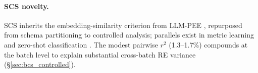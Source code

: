 \paragraph{SCS novelty.}
SCS inherits the embedding-similarity criterion from LLM-PEE \citep{llm-pee-2025}, repurposed from schema partitioning to controlled analysis; parallels exist in metric learning \citep{snell2017prototypical} and zero-shot classification \citep{yin-2019-zero-shot-bench}. The modest pairwise $r^2$ (1.3--1.7\%) compounds at the batch level to explain substantial cross-batch RE variance (\S\ref{sec:bcs_controlled}).

\begin{table}[t]
\centering
\small
{}
\caption{Dataset statistics. BCS Range: min--max over count-curve batches. Embedding: model used for SCS/BCS; ranges are not comparable across embedding models. $^\dagger$Trigger mentions across 8{,}042 sentences.}
\label{tab:datasets}
\end{table}

